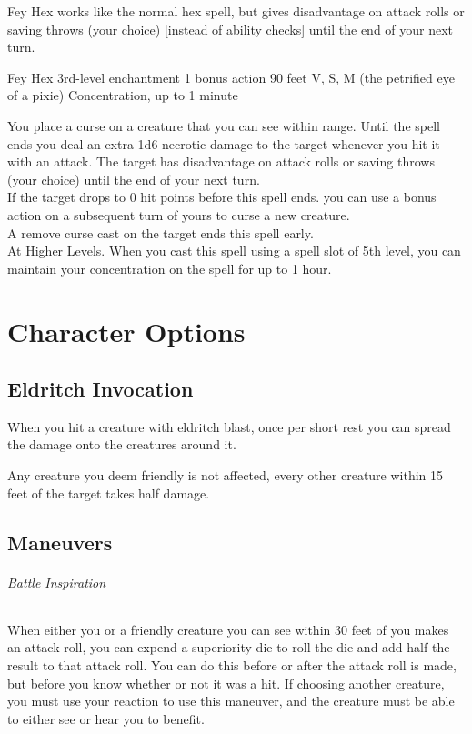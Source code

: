 \documentclass[letter,10pt,twocolumn,openany]{dndbook}
\begin{document}
Fey Hex works like the normal hex spell, but gives disadvantage on attack rolls or saving throws (your choice) [instead of ability checks] until the end of your next turn.

\DndSpellHeader
  {Fey Hex}
  {3rd-level enchantment}
  {1 bonus action}
  {90 feet}
  {V, S, M (the petrified eye of a pixie)}
  {Concentration, up to 1 minute}

You place a curse on a creature that you can see within range. Until the spell ends you deal an extra 1d6 necrotic damage to the target whenever you hit it with an attack. The target has disadvantage on attack rolls or saving throws (your choice) until the end of your next turn.\\
If the target drops to 0 hit points before this spell ends. you can use a bonus action on a subsequent turn of yours to curse a new creature.\\
A remove curse cast on the target ends this spell early.\\
At Higher Levels. When you cast this spell using a spell slot of 5th level, you can maintain your concentration on the spell for up to 1 hour.

\chapter{Character Options}

\section{Eldritch Invocation}


When you hit a creature with eldritch blast, once per short rest you can spread the damage onto the creatures around it.

Any creature you deem friendly is not affected, every other creature within 15 feet of the target takes half damage.

\section{Maneuvers}

\subparagraph{Battle Inspiration}
When either you or a friendly creature you can see within 30 feet of you makes an attack roll, you can expend a superiority die to roll the die and add half the result to that attack roll. You can do this before or after the attack roll is made, but before you know whether or not it was a hit. If choosing another creature, you must use your reaction to use this maneuver, and the creature must be able to either see or hear you to benefit.
\end{document}
